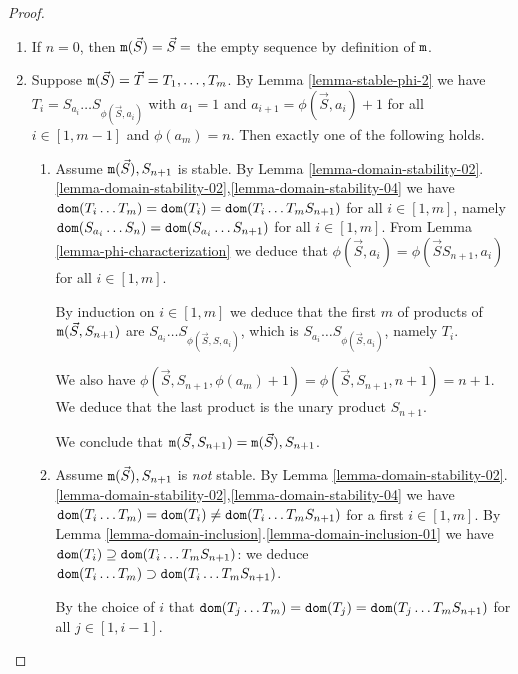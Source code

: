 \documentclass{lmcs}
\begin{document}
\begin{proof}
\begin{enumerate}
\item
If $n=0$, then ${\tt m}(\vec{S}) = \vec{S} = $ the empty sequence by definition
of ${\tt m}$.

\item
Suppose ${\tt m}(\vec{S}) = \vec{T} = T_1, \ldots, T_m$.  
By Lemma \ref{lemma-stable-phi-2}
we have $T_i = S_{a_i} \ldots S_{\phi(\vec{S},a_i)}$ with 
$a_1=1$ and $a_{i+1} = \phi(\vec{S},a_i)+1$ 
for all $i \in [1,m-1]$ and $\phi(a_{m}) = n$.  Then exactly one of the following holds.

\begin{enumerate}

\item
Assume ${\tt m}(\vec{S}), S_{n+1}$ is stable. By 
Lemma \ref{lemma-domain-stability-02}.
\ref{lemma-domain-stability-02},\ref{lemma-domain-stability-04} 
we have
${\tt dom}(T_i \ldots T_m) = {\tt dom}(T_i ) = {\tt dom}(T_i \ldots T_m S_{n+1})$ for all $i \in [1,m]$,
namely ${\tt dom}(S_{a_i} \ldots S_n) = {\tt dom}(S_{a_i} \ldots  S_{n+1})$ for all $i \in [1,m]$.
From Lemma \ref{lemma-phi-characterization} we deduce that $\phi(\vec{S},a_i) = 
\phi(\vec{S}S_{n+1},a_i)$ for all $i \in [1,m]$. 

By induction on $i \in [1,m]$ we deduce that the first $m$ of products of 
${\tt m}(\vec{S},S_{n+1})$ are $S_{a_i} \ldots S_{\phi(\vec{S},S,a_i)}$, which is
$S_{a_i} \ldots S_{\phi(\vec{S},a_i)}$, namely $T_i$.

We also have  $\phi(\vec{S},S_{n+1},\phi(a_{m}) +1)
= \phi(\vec{S},S_{n+1},n+1)=n+1$. We deduce that the last product is 
the unary product $S_{n+1}$.

We conclude that ${\tt m}(\vec{S}, S_{n+1}) = {\tt m}(\vec{S}), S_{n+1}$.

\item
Assume ${\tt m}(\vec{S}), S_{n+1}$ is \emph{not} stable. By 
Lemma \ref{lemma-domain-stability-02}.
\ref{lemma-domain-stability-02},\ref{lemma-domain-stability-04} 
we have
${\tt dom}(T_i \ldots T_m) = {\tt dom}(T_i ) \not = {\tt dom}(T_i \ldots T_m S_{n+1})$ 
for a first $i \in [1,m]$.
By Lemma \ref{lemma-domain-inclusion}.\ref{lemma-domain-inclusion-01}
we have ${\tt dom}(T_i ) \supseteq  {\tt dom}(T_i \ldots T_m S_{n+1})$:
we deduce ${\tt dom}(T_i \ldots T_m) \supset {\tt dom}(T_i \ldots T_m S_{n+1})$.

By the choice of $i$ that 
${\tt dom}(T_j \ldots T_m) = {\tt dom}(T_j ) = {\tt dom}(T_j \ldots T_m S_{n+1})$ for all $j \in [1,i-1]$.


\end{enumerate}
\end{enumerate}
\end{proof}
\end{document}
